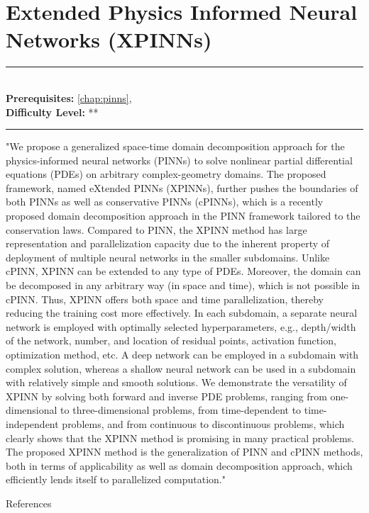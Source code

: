 \documentclass[book.tex]{subfiles}
\begin{document}
\chapter{Extended Physics Informed Neural Networks (XPINNs)}
\label{chap:pinns_ns}
\noindent\rule{11cm}{0.4pt} \\
\textbf{Prerequisites:}  \autoref{chap:pinns},  \\
\textbf{Difficulty Level:} ** \\
\noindent\rule{11cm}{0.4pt}
\vspace{5mm}

"We propose a generalized space-time domain decomposition approach for the physics-informed neural networks (PINNs) to solve nonlinear partial differential equations (PDEs) on arbitrary complex-geometry domains. The proposed framework, named eXtended PINNs (XPINNs), further pushes the boundaries of both PINNs as well as conservative PINNs (cPINNs), which is a recently proposed domain decomposition approach in the PINN framework tailored to the conservation laws. Compared to PINN, the XPINN method has large representation and parallelization capacity due to the inherent property of deployment of multiple neural networks in the smaller subdomains. Unlike cPINN, XPINN can be extended to any type of PDEs. Moreover, the domain can be decomposed in any arbitrary way (in space and time), which is not possible in cPINN. Thus, XPINN offers both space and time parallelization, thereby reducing the training cost more effectively. In each subdomain, a separate neural network is employed with optimally selected hyperparameters, e.g., depth/width of the network, number, and location of residual points, activation function, optimization method, etc. A deep network can be employed in a subdomain with complex solution, whereas a shallow neural network can be used in a subdomain with relatively simple and smooth solutions. We demonstrate the versatility of XPINN by solving both forward and inverse PDE problems, ranging from one-dimensional to three-dimensional problems, from time-dependent to time-independent problems, and from continuous to discontinuous problems, which clearly shows that the XPINN method is promising in many practical problems. The proposed XPINN method is the generalization of PINN and cPINN methods, both in terms of applicability as well as domain decomposition approach, which efficiently lends itself to parallelized computation."

References \cite{jagtap2020extended}
\end{document}
